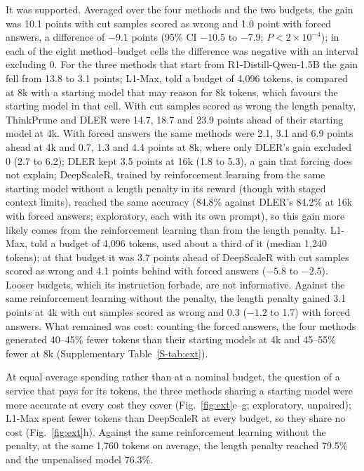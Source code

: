 \documentclass[10pt]{article}
\newcommand{\sref}[1]{\ref{S-#1}}
\begin{document}
It was supported. Averaged over the four methods and the two budgets, the gain was 10.1 points with cut samples scored as wrong and 1.0 point with forced answers, a difference of $-9.1$ points (95\% CI $-10.5$ to $-7.9$; $P<2\times10^{-4}$); in each of the eight method--budget cells the difference was negative with an interval excluding 0. For the three methods that start from R1-Distill-Qwen-1.5B the gain fell from 13.8 to 3.1 points; L1-Max, told a budget of 4{,}096 tokens, is compared at 8k with a starting model that may reason for 8k tokens, which favours the starting model in that cell. With cut samples scored as wrong the length penalty, ThinkPrune and DLER were 14.7, 18.7 and 23.9 points ahead of their starting model at 4k. With forced answers the same methods were 2.1, 3.1 and 6.9 points ahead at 4k and 0.7, 1.3 and 4.4 points at 8k, where only DLER's gain excluded 0 (2.7 to 6.2); DLER kept 3.5 points at 16k (1.8 to 5.3), a gain that forcing does not explain; DeepScaleR, trained by reinforcement learning from the same starting model without a length penalty in its reward (though with staged context limits), reached the same accuracy (84.8\% against DLER's 84.2\% at 16k with forced answers; exploratory, each with its own prompt), so this gain more likely comes from the reinforcement learning than from the length penalty. L1-Max, told a budget of 4{,}096 tokens, used about a third of it (median 1{,}240 tokens); at that budget it was 3.7 points ahead of DeepScaleR with cut samples scored as wrong and 4.1 points behind with forced answers ($-5.8$ to $-2.5$). Looser budgets, which its instruction forbade, are not informative. Against the same reinforcement learning without the penalty, the length penalty gained 3.1 points at 4k with cut samples scored as wrong and 0.3 ($-1.2$ to 1.7) with forced answers. What remained was cost: counting the forced answers, the four methods generated 40--45\% fewer tokens than their starting models at 4k and 45--55\% fewer at 8k (Supplementary Table~\sref{tab:ext}).

At equal average spending rather than at a nominal budget, the question of a service that pays for its tokens, the three methods sharing a starting model were more accurate at every cost they cover (Fig.~\ref{fig:ext}e--g; exploratory, unpaired); L1-Max spent fewer tokens than DeepScaleR at every budget, so they share no cost (Fig.~\ref{fig:ext}h). Against the same reinforcement learning without the penalty, at the same 1{,}760 tokens on average, the length penalty reached 79.5\% and the unpenalised model 76.3\%.
\end{document}
